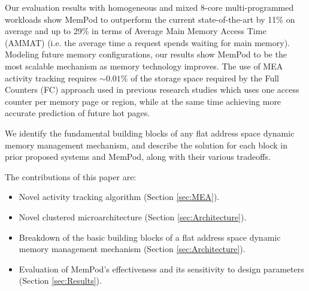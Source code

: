 Our evaluation results with homogeneous and mixed 8-core multi-programmed workloads show MemPod to outperform the current state-of-the-art by 11\% on average and up to 29\% in terms of Average Main Memory Access Time (AMMAT) (i.e. the average time a request spends waiting for main memory). Modeling future memory configurations, our results show MemPod to be the most scalable mechanism as memory technology improves. The use of MEA activity tracking requires $\sim0.01\%$ of the storage space required by the Full Counters (FC) approach used in previous research studies which uses one access counter per memory page or region, while at the same time achieving more accurate prediction
of future hot pages.


We identify the fundamental building blocks of any flat address space dynamic 
memory management mechanism, and describe the solution for each block in 
prior proposed systems and MemPod, along with their various tradeoffs. 


The contributions of this paper are:

\begin{itemize}
\item Novel activity tracking algorithm (Section \ref{sec:MEA}).
\item Novel clustered microarchitecture (Section \ref{sec:Architecture}).
\item Breakdown of the basic building blocks of a flat address space dynamic memory management mechanism (Section \ref{sec:Architecture}).
\item Evaluation of MemPod's effectiveness and its sensitivity to design parameters (Section \ref{sec:Results}).
\end{itemize}

